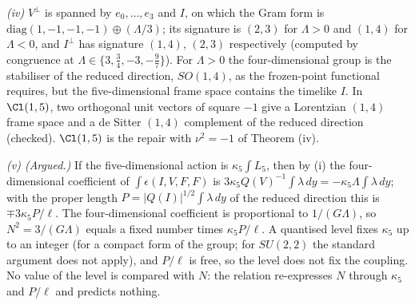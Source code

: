 \emph{(iv)} $V^{\perp}$ is spanned by $e_{0}, \ldots, e_{3}$ and $I$, on which the Gram form is $\mathrm{diag}(1, -1, -1, -1) \oplus (\Lambda/3)$; its signature is $(2,3)$ for $\Lambda > 0$ and $(1,4)$ for $\Lambda < 0$, and $I^{\perp}$ has signature $(1,4)$, $(2,3)$ respectively (computed by congruence at $\Lambda \in \{3, \tfrac34, -3, -\tfrac97\}$). For $\Lambda > 0$ the four-dimensional group is the stabiliser of the reduced direction, $SO(1,4)$, as the frozen-point functional requires, but the five-dimensional frame space contains the timelike $I$. In $\Cl(1,5)$, two orthogonal unit vectors of square $-1$ give a Lorentzian $(1,4)$ frame space and a de Sitter $(1,4)$ complement of the reduced direction (checked). $\Cl(1,5)$ is the repair with $\nu^{2} = -1$ of Theorem (iv).

\emph{(v) (Argued.)} If the five-dimensional action is $\kappa_{5}\int L_{5}$, then by (i) the four-dimensional coefficient of $\int\epsilon(I, V, F, F)$ is $3\kappa_{5}Q(V)^{-1}\int\lambda\,dy = -\kappa_{5}\Lambda\int\lambda\,dy$; with the proper length $P = |Q(I)|^{1/2}\int\lambda\,dy$ of the reduced direction this is $\mp 3\kappa_{5}P/\ell$. The four-dimensional coefficient is proportional to $1/(G\Lambda)$, so $N^{2} = 3/(G\Lambda)$ equals a fixed number times $\kappa_{5}P/\ell$. A quantised level fixes $\kappa_{5}$ up to an integer (for a compact form of the group; for $SU(2,2)$ the standard argument does not apply), and $P/\ell$ is free, so the level does not fix the coupling. No value of the level is compared with $N$: the relation re-expresses $N$ through $\kappa_{5}$ and $P/\ell$ and predicts nothing.
